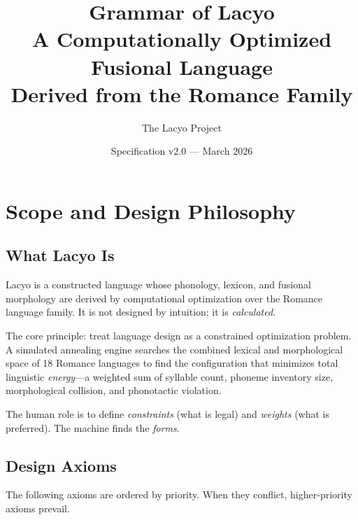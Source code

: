 \documentclass[12pt]{book}
\title{Grammar of Lacyo\\[1em]\large A Computationally Optimized Fusional Language\\Derived from the Romance Family}
\author{The Lacyo Project}
\date{Specification v2.0 --- March 2026}
\begin{document}
\maketitle
\tableofcontents

\chapter{Scope and Design Philosophy}

\section{What Lacyo Is}

Lacyo is a constructed language whose phonology, lexicon, and fusional morphology
are derived by computational optimization over the Romance language family.
It is not designed by intuition; it is \emph{calculated}.

The core principle: treat language design as a constrained optimization problem.
A simulated annealing engine searches the combined lexical and morphological space
of 18 Romance languages to find the configuration that minimizes total linguistic
\emph{energy}---a weighted sum of syllable count, phoneme inventory size,
morphological collision, and phonotactic violation.

The human role is to define \emph{constraints} (what is legal) and
\emph{weights} (what is preferred). The machine finds the \emph{forms}.

\section{Design Axioms}

The following axioms are ordered by priority. When they conflict, higher-priority
axioms prevail.
\end{document}
